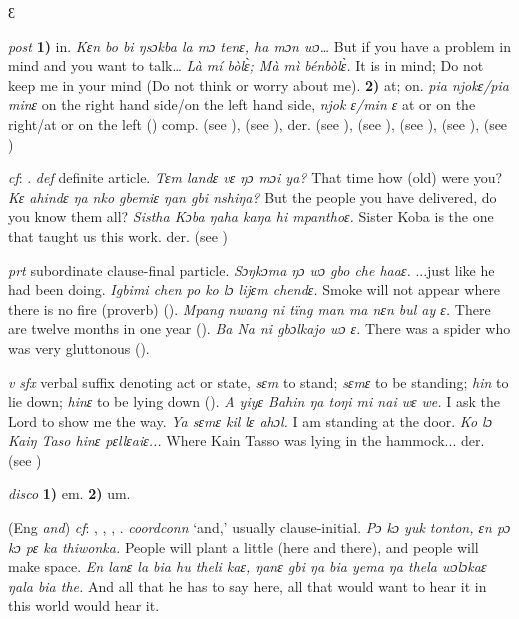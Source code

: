 \begin{letter}{Ɛ}

 \textit{post} \textbf{1)} in. \textit{Kɛn bo bi ŋsɔkba la mɔ tenɛ, ha mɔn wɔ…} But if you have a problem in mind and you want to talk… \textit{Là mí bòlɛ̀; Mà mì bénbòlɛ̀.} It is in mind; Do not keep me in your mind (Do not think or worry about me). \textbf{2)} at; on. \textit{pia njokɛ/pia minɛ} on the right hand side/on the left hand side, \textit{njok ɛ/min ɛ} at or on the right/at or on the left (\citealt{Pichl1967}) comp.  (see ),  (see ), der.  (see ),  (see ),  (see ),  (see ),  (see )

 \textit{cf}: . \textit{def} definite article. \textit{Tɛm landɛ vɛ ŋɔ mɔi ya?} That time how (old) were you? \textit{Kɛ ahindɛ ŋa nko gbemiɛ ŋan gbi nshiŋa?} But the people you have delivered, do you know them all? \textit{Sistha Kɔba ŋaha kaŋa hi mpanthoɛ.} Sister Koba is the one that taught us this work. der.  (see ) 

 \textit{prt} subordinate clause-final particle. \textit{Sɔŋkɔma ŋɔ wɔ gbo che haaɛ.} ...just like he had been doing. \textit{Igbimi chen po ko lɔ lijɛm chendɛ.} Smoke will not appear where there is no fire (proverb) (\citealt{TISLL1979}). \textit{Mpang nwang ni tïng man ma nɛn bul ay ɛ.} There are twelve months in one year (\citealt{Pichl1967}). \textit{Ba Na ni gbɔlkajo wɔ ɛ.} There was a spider who was very gluttonous (\citealt{Pichl1967}).

 \textit{v} \textit{sfx} verbal suffix denoting act or state, \textit{sɛm} to stand; \textit{sɛmɛ} to be standing; \textit{hin} to lie down; \textit{hinɛ} to be lying down (\citealt{Sumner1921}). \textit{A yiyɛ Bahin ŋa toŋi mi nai wɛ we.} I ask the Lord to show me the way. \textit{Ya sɛmɛ kil lɛ ahɔl.} I am standing at the door. \textit{Ko lɔ Kaiŋ Taso hinɛ pɛllɛaiɛ...} Where Kain Tasso was lying in the hammock... der.  (see ) 

 \textit{disco} \textbf{1)} em. \textbf{2)} um.

 (Eng \textit{and}) \textit{cf}: , , , . \textit{coordconn} ‘and,' usually clause-initial. \textit{Pɔ kɔ yuk tonton, ɛn pɔ kɔ pɛ ka thiwonka.} People will plant a little (here and there), and people will make space. \textit{En lanɛ la bia hu theli kaɛ, ŋanɛ gbi ŋa bia yema ŋa thela wɔlɔkaɛ ŋala bia the.} And all that he has to say here, all that would want to hear it in this world would hear it.

\end{letter}
